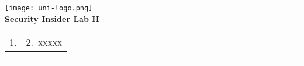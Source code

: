 \begin{titlepage}
    \centering
    \begin{onehalfspace}
    	\begin{german}
        	\texttt{[image: uni-logo.png]}\\
        	\vspace{1.0cm}
        	\large {\bfseries Security Insider Lab II}\\ 

        	\vspace{2.5cm}

            \begin{doublespace}
            	\textenglish{\textsf{\Huge{\thetitle}}}
            \end{doublespace}

        	\vspace{2cm}
    
            

        	\vspace{1cm}

        	{\bfseries \large{\theauthor}}

        	\vfill

        	{\large
        		\begin{tabular}[l]{cc}
        			\textsc{1.} & \textsc{2.~xxxxx} \\
        			
        		\end{tabular}
        	}

        	\vspace{1.5cm}

        	\parbox{\linewidth}{\hrule\strut}

            \vfill

	    \textgerman{\thedate}
    	\end{german}
    \end{onehalfspace}
\end{titlepage}
